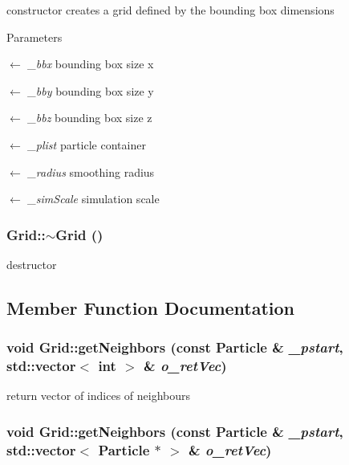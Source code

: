 constructor creates a grid defined by the bounding box dimensions 
\begin{DoxyParams}{Parameters}
\item[\mbox{$\leftarrow$} {\em \_\-bbx}]bounding box size x \item[\mbox{$\leftarrow$} {\em \_\-bby}]bounding box size y \item[\mbox{$\leftarrow$} {\em \_\-bbz}]bounding box size z \item[\mbox{$\leftarrow$} {\em \_\-plist}]particle container \item[\mbox{$\leftarrow$} {\em \_\-radius}]smoothing radius \item[\mbox{$\leftarrow$} {\em \_\-simScale}]simulation scale \end{DoxyParams}
\hypertarget{classGrid_a3661d0a7f998caaaf8627d7a67072116}{
\subsubsection[{$\sim$Grid}]{\setlength{\rightskip}{0pt plus 5cm}Grid::$\sim$Grid ()}}
\label{classGrid_a3661d0a7f998caaaf8627d7a67072116}


destructor 

\subsection{Member Function Documentation}
\hypertarget{classGrid_a1e904362638c9c3f83f6a14fe553f868}{
\subsubsection[{getNeighbors}]{\setlength{\rightskip}{0pt plus 5cm}void Grid::getNeighbors (const {\bf Particle} \& {\em \_\-pstart}, \/  std::vector$<$ int $>$ \& {\em o\_\-retVec})}}
\label{classGrid_a1e904362638c9c3f83f6a14fe553f868}


return vector of indices of neighbours \hypertarget{classGrid_a4f593e269e61cdbb9d3057269120e432}{
\subsubsection[{getNeighbors}]{\setlength{\rightskip}{0pt plus 5cm}void Grid::getNeighbors (const {\bf Particle} \& {\em \_\-pstart}, \/  std::vector$<$ {\bf Particle} $\ast$ $>$ \& {\em o\_\-retVec})}}
\label{classGrid_a4f593e269e61cdbb9d3057269120e432}


